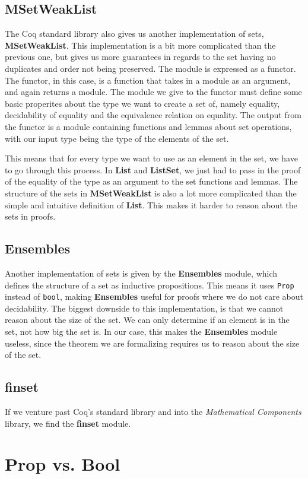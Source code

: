 \subsection{MSetWeakList}

The Coq standard library also gives us another implementation of sets, \textbf{MSetWeakList}.
This implementation is a bit more complicated than the previous one,
but gives us more guarantees in regards to the set having no duplicates and order not being preserved.
The module is expressed as a functor.
The functor, in this case, is a function that takes in a module as an argument, and again returns a module.
The module we give to the functor must define some basic properites about the type we want to create a set of,
namely equality, decidability of equality and the equivalence relation on equality.
The output from the functor is a module containing functions and lemmas about set operations,
with our input type being the type of the elements of the set.

This means that for every type we want to use as an element in the set, we have to go through this process.
In \textbf{List} and \textbf{ListSet}, we just had to pass in the proof of the equality of the type as an argument to the set functions and lemmas.
The structure of the sets in \textbf{MSetWeakList} is also a lot more complicated than the simple and intuitive definition of \textbf{List}.
This makes it harder to reason about the sets in proofs.

\subsection{Ensembles}

Another implementation of sets is given by the \textbf{Ensembles} module, which defines the structure of a set as inductive propositions.
This means it uses \lstinline[language=Coq]{Prop} instead of \lstinline[language=Coq]{bool},
making \textbf{Ensembles} useful for proofs where we do not care about decidability.
The biggest downside to this implementation, is that we cannot reason about the size of the set.
We can only determine if an element is in the set, not how big the set is.
In our case, this makes the \textbf{Ensembles} module useless, since the theorem we are formalizing requires us to reason about the
size of the set.

\subsection{finset}

If we venture past Coq's standard library and into the \textit{Mathematical Components} library, we find the \textbf{finset} module.


\section{Prop vs. Bool}
